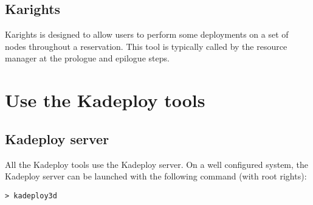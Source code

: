 \documentclass[a4wide,10pt,oneside]{book}
\begin{document}
\subsection{Karights}
Karights is designed to allow users to perform some deployments on a set of nodes throughout a reservation. This tool is typically called by the resource manager at the prologue and epilogue steps.

\section{Use the Kadeploy tools}
\subsection{Kadeploy server}
All the Kadeploy tools use the Kadeploy server. On a well configured system, the Kadeploy server can be launched with the following command (with root rights):
\begin{verbatim}
> kadeploy3d
\end{verbatim}
\end{document}
